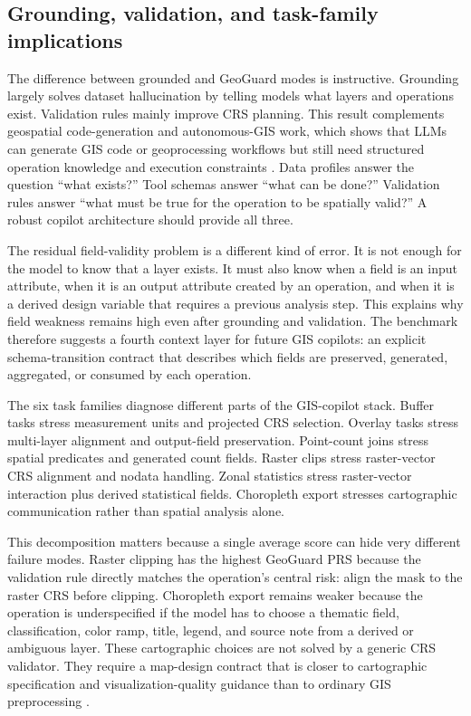 \documentclass[12pt]{gsis}  %
\begin{document}
\subsection{Grounding, validation, and task-family implications}

The difference between grounded and GeoGuard modes is instructive. Grounding largely solves dataset hallucination by telling models what layers and operations exist. Validation rules mainly improve CRS planning. This result complements geospatial code-generation and autonomous-GIS work, which shows that LLMs can generate GIS code or geoprocessing workflows but still need structured operation knowledge and execution constraints \citep{Hou_2025_GeoCode,Hou_2025_GEEOPs,Li_2025_AutonomousGIS}. Data profiles answer the question ``what exists?'' Tool schemas answer ``what can be done?'' Validation rules answer ``what must be true for the operation to be spatially valid?'' A robust copilot architecture should provide all three.

The residual field-validity problem is a different kind of error. It is not enough for the model to know that a layer exists. It must also know when a field is an input attribute, when it is an output attribute created by an operation, and when it is a derived design variable that requires a previous analysis step. This explains why field weakness remains high even after grounding and validation. The benchmark therefore suggests a fourth context layer for future GIS copilots: an explicit schema-transition contract that describes which fields are preserved, generated, aggregated, or consumed by each operation.

The six task families diagnose different parts of the GIS-copilot stack. Buffer tasks stress measurement units and projected CRS selection. Overlay tasks stress multi-layer alignment and output-field preservation. Point-count joins stress spatial predicates and generated count fields. Raster clips stress raster-vector CRS alignment and nodata handling. Zonal statistics stress raster-vector interaction plus derived statistical fields. Choropleth export stresses cartographic communication rather than spatial analysis alone.

This decomposition matters because a single average score can hide very different failure modes. Raster clipping has the highest GeoGuard PRS because the validation rule directly matches the operation's central risk: align the mask to the raster CRS before clipping. Choropleth export remains weaker because the operation is underspecified if the model has to choose a thematic field, classification, color ramp, title, legend, and source note from a derived or ambiguous layer. These cartographic choices are not solved by a generic CRS validator. They require a map-design contract that is closer to cartographic specification and visualization-quality guidance than to ordinary GIS preprocessing \citep{Roth_2013,Roth_2015,Kang_2024,Munzner_2009}.
\end{document}
